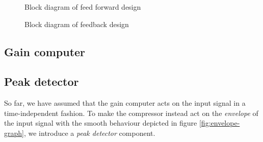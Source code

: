 \documentclass[]{article}
\begin{document}
\begin{figure}[ht]
\centering

\caption{Block diagram of feed forward design}
\label{fig:feedforward-blockdiagram}
\end{figure}

\begin{figure}[ht]
\centering

\caption{Block diagram of feedback design} 
\label{fig:feedback-blockdiagram}
\end{figure}

\subsection{Gain computer}
\subsection{Peak detector}
So far, we have assumed that the gain computer acts on the input signal in a time-independent fashion. To make the compressor instead act on the \emph{envelope} of the input signal with the smooth behaviour depicted in figure \ref{fig:envelope-graph}, we introduce a \emph{peak detector} component.






\end{document}
